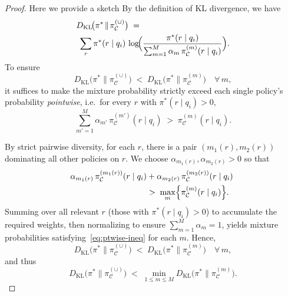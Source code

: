 \begin{proof}
Here we provide a sketch By the definition of KL divergence, we have
\begin{equation}
\label{eq:KL-def}
\begin{split}
  &D_{\mathrm{KL}}\!\bigl(\pi^*\!\parallel\!\pi_{\mathcal{C}}^{(\cup)}\bigr)
  \;=\\&\;\sum_{r}\pi^*(r\mid q_i)\,
  \log\!\Bigl(\frac{\pi^*(r\mid q_i)}{\sum_{m=1}^M \alpha_m \,\pi_{\mathcal{C}}^{(m)}(r\mid q_i)}\Bigr).
\end{split}
\end{equation}
To ensure 
\[
   D_{\mathrm{KL}}\!\bigl(\pi^*\!\parallel\!\pi_{\mathcal{C}}^{(\cup)}\bigr)
   \;<\; D_{\mathrm{KL}}\!\bigl(\pi^*\!\parallel\!\pi_{\mathcal{C}}^{(m)}\bigr)
   \quad\forall\,m,
\]
it suffices to make the mixture probability strictly exceed each single policy's probability \emph{pointwise}, i.e.\ for every $r$ with $\pi^*(r\mid q_i)>0$,
\begin{equation}
\label{eq:ptwise-ineq}
   \sum_{m'=1}^M \alpha_{m'} \,\pi_{\mathcal{C}}^{(m')}(r\mid q_i)
   \;>\;\pi_{\mathcal{C}}^{(m)}(r\mid q_i).
\end{equation}

By strict pairwise diversity, for each $r$, there is a pair $(m_1(r), m_2(r))$ dominating all other policies on $r$.  We choose $\alpha_{m_1(r)},\alpha_{m_2(r)} > 0$ so that
\begin{align}
\begin{split}
 \alpha_{m_1(r)}\,\pi_{\mathcal{C}}^{(m_1(r))}(r\mid q_i) 
  & +  \alpha_{m_2(r)}\,\pi_{\mathcal{C}}^{(m_2(r))}(r\mid q_i)
   \; \\& >\;\max_{m}\Bigl\{\pi_{\mathcal{C}}^{(m)}(r\mid q_i)\Bigr\}.
\end{split}
\end{align}
Summing over all relevant $r$ (those with $\pi^*(r\mid q_i)>0$) to accumulate the required weights, then normalizing to ensure $\sum_{m=1}^M \alpha_m=1$, yields mixture probabilities satisfying~\eqref{eq:ptwise-ineq} for each $m$.  Hence,
\[
   D_{\mathrm{KL}}\!\bigl(\pi^*\!\parallel\!\pi_{\mathcal{C}}^{(\cup)}\bigr)
   \;<\; D_{\mathrm{KL}}\!\bigl(\pi^*\!\parallel\!\pi_{\mathcal{C}}^{(m)}\bigr)
   \quad\forall\,m,
\]
and thus
\[
   D_{\mathrm{KL}}\!\bigl(\pi^*\!\parallel\!\pi_{\mathcal{C}}^{(\cup)}\bigr)
   \;<\; \min_{1\le m\le M} D_{\mathrm{KL}}\!\bigl(\pi^*\!\parallel\!\pi_{\mathcal{C}}^{(m)}\bigr).
\]
\end{proof}


